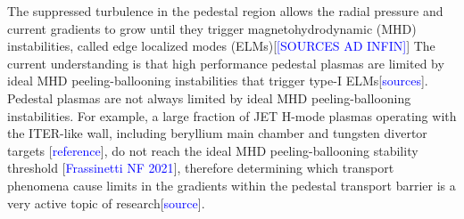 \documentclass[a4paper, twoside, final, 12pt]{article}
\begin{document}
The suppressed turbulence in the pedestal region allows the radial pressure  and current gradients to grow until they trigger magnetohydrodynamic (MHD) instabilities, called edge localized modes (ELMs)[\textcolor{blue}{[SOURCES AD INFIN]}]
The current understanding is that high performance pedestal plasmas are limited by ideal MHD peeling-ballooning instabilities that trigger type-I ELMs[\textcolor{blue}{sources}].
Pedestal plasmas are not always limited by ideal MHD peeling-ballooning instabilities.
For example, a large fraction of JET H-mode plasmas operating with the ITER-like wall, including beryllium main chamber and tungsten divertor targets [\textcolor{blue}{reference}], do not reach the ideal MHD peeling-ballooning stability threshold [\textcolor{blue}{Frassinetti NF 2021}], therefore determining which transport phenomena cause limits in the gradients within the pedestal transport barrier is a very active topic of research[\textcolor{blue}{source}].
\end{document}

